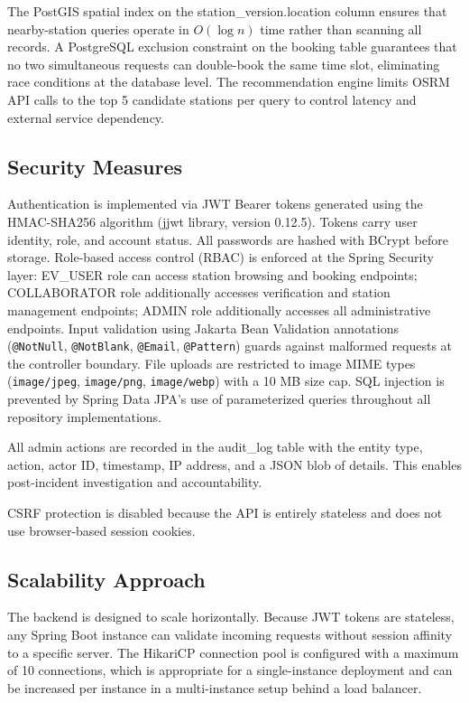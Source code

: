 \documentclass[../Main.tex]{subfiles}
\begin{document}
The PostGIS spatial index on the station\_version.location column ensures that nearby-station queries operate in $O(\log n)$ time rather than scanning all records. A PostgreSQL exclusion constraint on the booking table guarantees that no two simultaneous requests can double-book the same time slot, eliminating race conditions at the database level. The recommendation engine limits OSRM API calls to the top 5 candidate stations per query to control latency and external service dependency.

\subsection{Security Measures}
\label{subsection:2.4.2}
Authentication is implemented via JWT Bearer tokens generated using the HMAC-SHA256 algorithm (jjwt library, version 0.12.5). Tokens carry user identity, role, and account status. All passwords are hashed with BCrypt before storage. Role-based access control (RBAC) is enforced at the Spring Security layer: EV\_USER role can access station browsing and booking endpoints; COLLABORATOR role additionally accesses verification and station management endpoints; ADMIN role additionally accesses all administrative endpoints. Input validation using Jakarta Bean Validation annotations (\verb|@NotNull|, \verb|@NotBlank|, \verb|@Email|, \verb|@Pattern|) guards against malformed requests at the controller boundary. File uploads are restricted to image MIME types (\verb|image/jpeg|, \verb|image/png|, \verb|image/webp|) with a 10 MB size cap. SQL injection is prevented by Spring Data JPA's use of parameterized queries throughout all repository implementations.

All admin actions are recorded in the audit\_log table with the entity type, action, actor ID, timestamp, IP address, and a JSON blob of details. This enables post-incident investigation and accountability.

CSRF protection is disabled because the API is entirely stateless and does not use browser-based session cookies.

\subsection{Scalability Approach}
\label{subsection:2.4.3}
The backend is designed to scale horizontally. Because JWT tokens are stateless, any Spring Boot instance can validate incoming requests without session affinity to a specific server. The HikariCP connection pool is configured with a maximum of 10 connections, which is appropriate for a single-instance deployment and can be increased per instance in a multi-instance setup behind a load balancer.
\end{document}
